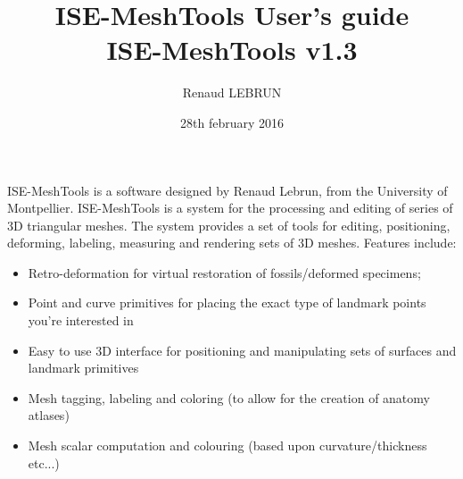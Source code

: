 \documentclass[12pt, a4paper]{book}
\title{ISE-MeshTools User's guide\\ISE-MeshTools v1.3}
\author{Renaud LEBRUN}
\date{28th february 2016}
\begin{document}
	\dominitoc

	\maketitle
   ISE-MeshTools is a software designed by Renaud Lebrun, from the University of Montpellier. ISE-MeshTools is a 
system for the processing and editing of series of 3D triangular meshes. The system provides a set of tools for editing, 
positioning, deforming, labeling, measuring and rendering sets of 3D meshes. Features include:
\begin{itemize}
\item Retro-deformation for virtual restoration of fossils/deformed specimens;
\item Point and curve primitives for placing the exact type of landmark points you’re interested in
\item Easy to use 3D interface for positioning and manipulating sets of surfaces and landmark primitives
\item Mesh tagging, labeling and coloring (to allow for the creation of anatomy atlases)
\item Mesh scalar computation and colouring (based upon curvature/thickness etc...)
\end{itemize}


\tableofcontents


		 
		 
     
	   
		
		
		
\end{document}

